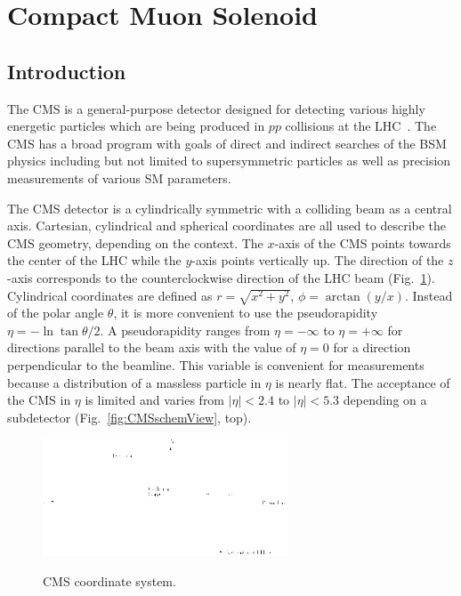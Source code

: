 \section{Compact Muon Solenoid}
\label{sec:Exp_CMS}
\subsection{Introduction}

The CMS is a general-purpose detector designed for detecting various highly energetic particles which are being produced in $pp$ collisions at the LHC~\cite{ref_CMS_TDR}. The CMS has a broad program with goals of direct and indirect searches of the BSM physics including but not limited to supersymmetric particles as well as precision measurements of various SM parameters. 


The CMS detector is a cylindrically symmetric with a colliding beam as a central axis. Cartesian, cylindrical and spherical coordinates are all used to describe the CMS geometry, depending on the context. The $x$-axis of the CMS points towards the center of the LHC while the $y$-axis points vertically up. The direction of the $z$-axis corresponds to the counterclockwise direction of the LHC beam (Fig.~\ref{fig:CMScoord}). Cylindrical coordinates are defined as $r=\sqrt{x^2+y^2}$, $\phi=\arctan(y/x)$. Instead of the polar angle $\theta$, it is more convenient to use the pseudorapidity $\eta=-\ln{\tan{\theta/2}}$. A pseudorapidity ranges from $\eta=-\infty$ to $\eta=+\infty$ for directions parallel to the beam axis with the value of $\eta=0$ for a direction perpendicular to the beamline. This variable is convenient for measurements because a distribution of a massless particle in $\eta$ is nearly flat. The acceptance of the CMS in $\eta$ is limited and varies from $|\eta|<2.4$ to $|\eta|<5.3$ depending on a subdetector (Fig.~\ref{fig:CMSschemView}, top).   

\begin{figure}[htb]
  \begin{center}
    {\includegraphics[width=0.65\textwidth]{../figs/Exp/CMScoord.png}}
    \caption{CMS coordinate system. }
    \label{fig:CMScoord}
  \end{center}
\end{figure}


